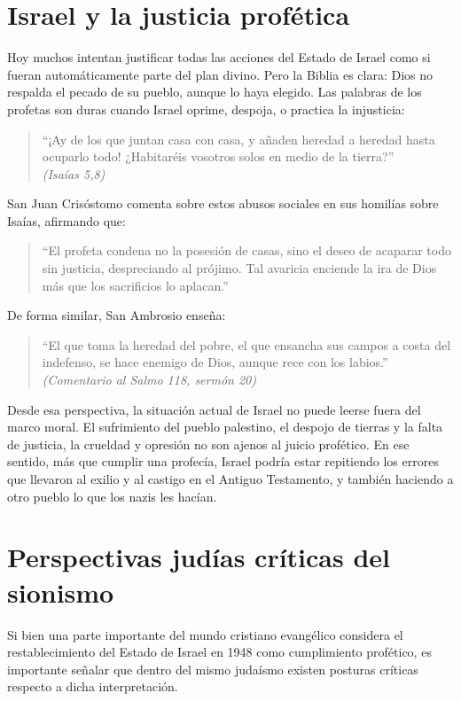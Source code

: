 \documentclass[12pt]{article}
\begin{document}
\section*{Israel y la justicia profética}
Hoy muchos intentan justificar todas las acciones del Estado de Israel como si fueran automáticamente parte del plan divino. Pero la Biblia es clara: Dios no respalda el pecado de su pueblo, aunque lo haya elegido. Las palabras de los profetas son duras cuando Israel oprime, despoja, o practica la injusticia:

\begin{quote}
“¡Ay de los que juntan casa con casa, y añaden heredad a heredad hasta ocuparlo todo! ¿Habitaréis vosotros solos en medio de la tierra?” \\ \emph{(Isaías 5,8)}
\end{quote}

San Juan Crisóstomo comenta sobre estos abusos sociales en sus homilías sobre Isaías, afirmando que:

\begin{quote}
“El profeta condena no la posesión de casas, sino el deseo de acaparar todo sin justicia, despreciando al prójimo. Tal avaricia enciende la ira de Dios más que los sacrificios lo aplacan.”
\end{quote}

De forma similar, San Ambrosio enseña:

\begin{quote}
“El que toma la heredad del pobre, el que ensancha sus campos a costa del indefenso, se hace enemigo de Dios, aunque rece con los labios.” \\ \emph{(Comentario al Salmo 118, sermón 20)}
\end{quote}

Desde esa perspectiva, la situación actual de Israel no puede leerse fuera del marco moral. El sufrimiento del pueblo palestino, el despojo de tierras y la falta de justicia, la crueldad y opresión no son ajenos al juicio profético. En ese sentido, más que cumplir una profecía, Israel podría estar repitiendo los errores que llevaron al exilio y al castigo en el Antiguo Testamento, y también haciendo a otro pueblo lo que los nazis les hacían.

\section*{Perspectivas judías críticas del sionismo}

Si bien una parte importante del mundo cristiano evangélico considera el restablecimiento del Estado de Israel en 1948 como cumplimiento profético, es importante señalar que dentro del mismo judaísmo existen posturas críticas respecto a dicha interpretación.
\end{document}

